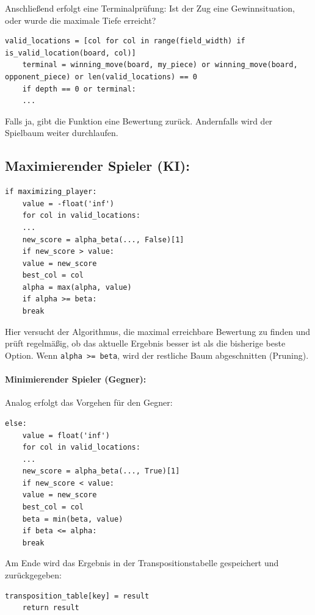 Anschließend erfolgt eine Terminalprüfung: Ist der Zug eine Gewinnsituation, oder wurde die maximale Tiefe erreicht?

\begin{lstlisting}[style=pythonstyle]
	valid_locations = [col for col in range(field_width) if is_valid_location(board, col)]
	terminal = winning_move(board, my_piece) or winning_move(board, opponent_piece) or len(valid_locations) == 0
	if depth == 0 or terminal:
	...
\end{lstlisting}

Falls ja, gibt die Funktion eine Bewertung zurück. Andernfalls wird der Spielbaum weiter durchlaufen.

\subsection{Maximierender Spieler (KI):}

\begin{lstlisting}[style=pythonstyle]
	if maximizing_player:
	value = -float('inf')
	for col in valid_locations:
	...
	new_score = alpha_beta(..., False)[1]
	if new_score > value:
	value = new_score
	best_col = col
	alpha = max(alpha, value)
	if alpha >= beta:
	break
\end{lstlisting}

Hier versucht der Algorithmus, die maximal erreichbare Bewertung zu finden und prüft regelmäßig, ob das aktuelle Ergebnis besser ist als die bisherige beste Option. Wenn \texttt{alpha >= beta}, wird der restliche Baum abgeschnitten (Pruning).

\paragraph*{Minimierender Spieler (Gegner):}

Analog erfolgt das Vorgehen für den Gegner:

\begin{lstlisting}[style=pythonstyle]
	else:
	value = float('inf')
	for col in valid_locations:
	...
	new_score = alpha_beta(..., True)[1]
	if new_score < value:
	value = new_score
	best_col = col
	beta = min(beta, value)
	if beta <= alpha:
	break
\end{lstlisting}

Am Ende wird das Ergebnis in der Transpositionstabelle gespeichert und zurückgegeben:

\begin{lstlisting}[style=pythonstyle]
	transposition_table[key] = result
	return result
\end{lstlisting}

